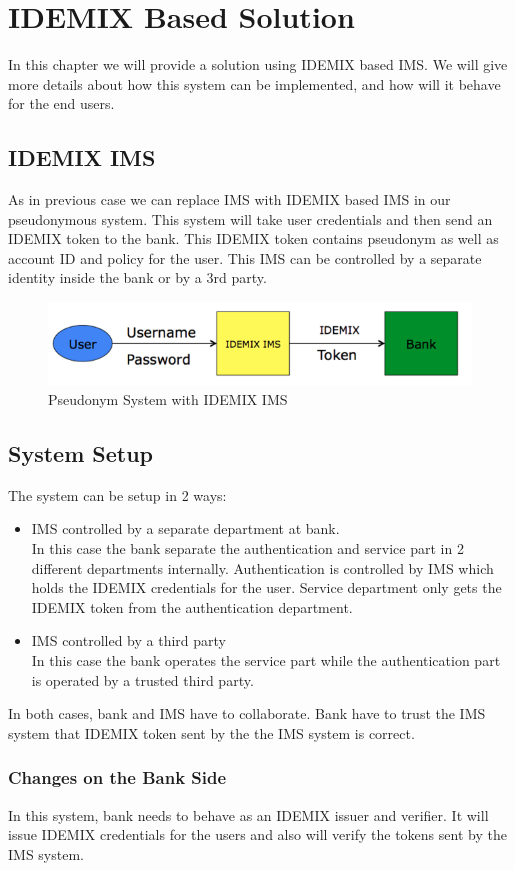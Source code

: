 \chapter{IDEMIX Based Solution}
In this chapter we will provide a solution using IDEMIX based IMS. We will give more details about how this system can be implemented, and how will it behave for the end users.
\section{IDEMIX IMS}
As in previous case we can replace IMS with IDEMIX based IMS in our pseudonymous system. This system will take user credentials and then send an IDEMIX token to the bank. This IDEMIX token contains pseudonym as well as account ID and policy for the user. This IMS can be controlled by a separate identity inside the bank or by a 3rd party.
\begin{figure}[h]
	\centering
	\includegraphics[width=\textwidth]{figures/IDEMIX}
	\caption{Pseudonym System with IDEMIX IMS}
	\label{fig:IDEMIX}
\end{figure}
\section{System Setup}
The system can be setup in 2 ways:
\begin{itemize}
	\item IMS controlled by a separate department at bank.\\
	In this case the bank separate the authentication and service part in 2 different departments internally. Authentication is controlled by IMS which holds the IDEMIX credentials for the user. Service department only gets the IDEMIX token from the authentication department.
	\item IMS controlled by a third party\\
	In this case the bank operates the service part while the authentication part is operated by a trusted third party.
\end{itemize}
In both cases, bank and IMS have to collaborate. Bank have to trust the IMS system that IDEMIX token sent by the the IMS system is correct.
\subsection{Changes on the Bank Side}
In this system, bank needs to behave as an IDEMIX issuer and verifier. It will issue IDEMIX credentials for the users and also will verify the tokens sent by the IMS system. 
